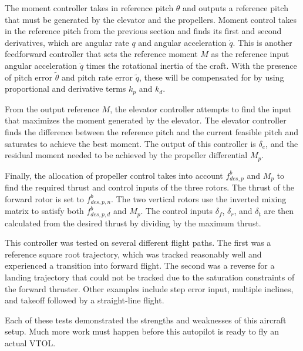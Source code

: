 The moment controller takes in reference pitch $\theta$ and outputs a reference pitch that must be generated by the elevator and the propellers.
Moment control takes in the reference pitch from the previous section and finds its first and second derivatives, which are angular rate $q$ and angular acceleration $\dot{q}$.
This is another feedforward controller that sets the reference moment $M$ as the reference input angular acceleration $\dot{q}$ times the rotational inertia of the craft.
With the presence of pitch error $\tilde{\theta}$ and pitch rate error $\tilde{q}$, these will be compensated for by using proportional and derivative terms $k_p$ and $k_d$.

From the output reference $M$, the elevator controller attempts to find the input that maximizes the moment generated by the elevator.
The elevator controller finds the difference between the reference pitch and the current feasible pitch and saturates to achieve the best moment.
The output of this controller is $\delta_e$, and the residual moment needed to be achieved by the propeller differential $M_p$.

Finally, the allocation of propeller control takes into account $f^b_{des,p}$ and $M_p$ to find the required thrust and control inputs of the three rotors.
The thrust of the forward rotor is set to $f^b_{des,p,n}$.
The two vertical rotors use the inverted mixing matrix to satisfy both $f^b_{des,p,d}$ and $M_p$.
The control inputs $\delta_f$, $\delta_r$, and $\delta_t$ are then calculated from the desired thrust by dividing by the maximum thrust.

This controller was tested on several different flight paths. 
The first was a reference square root trajectory, which was tracked reasonably well and experienced a transition into forward flight.
The second was a reverse for a landing trajectory that could not be tracked due to the saturation constraints of the forward thruster.
Other examples include step error input, multiple inclines, and takeoff followed by a straight-line flight.

Each of these tests demonstrated the strengths and weaknesses of this aircraft setup.
Much more work must happen before this autopilot is ready to fly an actual VTOL.
